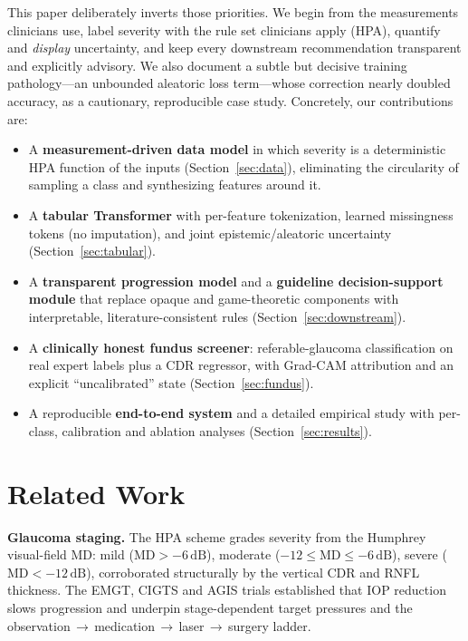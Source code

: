 \documentclass[10pt,twocolumn]{article}
\newcommand{\db}{\,\text{dB}}
\begin{document}
This paper deliberately inverts those priorities. We begin from the measurements
clinicians use, label severity with the rule set clinicians apply (HPA), quantify and
\emph{display} uncertainty, and keep every downstream recommendation transparent and
explicitly advisory. We also document a subtle but decisive training pathology---an
unbounded aleatoric loss term---whose correction nearly doubled accuracy, as a
cautionary, reproducible case study. Concretely, our contributions are:

\begin{itemize}
  \item A \textbf{measurement-driven data model} in which severity is a
  deterministic HPA function of the inputs (Section~\ref{sec:data}), eliminating the
  circularity of sampling a class and synthesizing features around it.
  \item A \textbf{tabular Transformer} with per-feature tokenization, learned
  missingness tokens (no imputation), and joint epistemic/aleatoric uncertainty
  (Section~\ref{sec:tabular}).
  \item A \textbf{transparent progression model} and a \textbf{guideline
  decision-support module} that replace opaque and game-theoretic components with
  interpretable, literature-consistent rules (Section~\ref{sec:downstream}).
  \item A \textbf{clinically honest fundus screener}: referable-glaucoma
  classification on real expert labels plus a CDR regressor, with Grad-CAM attribution
  and an explicit ``uncalibrated'' state (Section~\ref{sec:fundus}).
  \item A reproducible \textbf{end-to-end system} and a detailed empirical study with
  per-class, calibration and ablation analyses (Section~\ref{sec:results}).
\end{itemize}

\section{Related Work}
\textbf{Glaucoma staging.} The HPA scheme grades severity from the Humphrey
visual-field MD: mild ($\mathrm{MD}>-6\db$), moderate ($-12\le\mathrm{MD}\le-6\db$),
severe ($\mathrm{MD}<-12\db$), corroborated structurally by the vertical CDR and RNFL
thickness. The EMGT, CIGTS and AGIS trials established that IOP reduction slows
progression and underpin stage-dependent target pressures and the
observation\,$\rightarrow$\,medication\,$\rightarrow$\,laser\,$\rightarrow$\,surgery
ladder.
\end{document}

